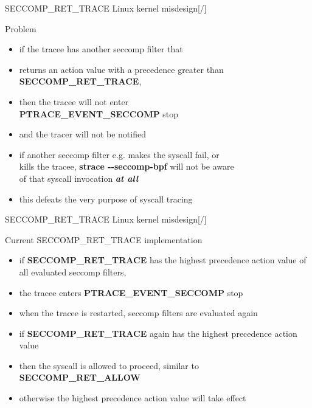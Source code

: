 \documentclass[unicode,aspectratio=169,xcolor={table,dvipsnames,usenames}]{beamer}
\begin{document}
\begin{frame}{\Large SECCOMP\_RET\_TRACE Linux kernel misdesign\hfill [\insertframenumber/\inserttotalframenumber]}
\Large
\begin{block}{Problem}
\begin{itemize}
	\item if the tracee has another seccomp filter that
	\item returns an action value with a precedence greater than \textbf{SECCOMP\_RET\_TRACE},
	\item then the tracee will not enter \\
		\textbf{PTRACE\_EVENT\_SECCOMP} stop
	\item and the tracer will not be notified
	\item if another seccomp filter e.g. makes the syscall fail, or \\
		kills the tracee, \textbf{strace -{}-seccomp-bpf} will not be aware \\
		of that syscall invocation \textbf{\textit{at all}}
	\item this defeats the very purpose of syscall tracing
\end{itemize}
\end{block}
\end{frame}

\begin{frame}{\Large SECCOMP\_RET\_TRACE Linux kernel misdesign\hfill [\insertframenumber/\inserttotalframenumber]}
\Large
\begin{block}{Current SECCOMP\_RET\_TRACE implementation}
\begin{itemize}
	\item if \textbf{SECCOMP\_RET\_TRACE} has the highest precedence action value of all evaluated seccomp filters,
	\item the tracee enters \textbf{PTRACE\_EVENT\_SECCOMP} stop
	\item when the tracee is restarted, seccomp filters are evaluated again
	\item if \textbf{SECCOMP\_RET\_TRACE} again has the highest precedence action value
	\item then the syscall is allowed to proceed, similar to \textbf{SECCOMP\_RET\_ALLOW}
	\item otherwise the highest precedence action value will take effect
\end{itemize}
\end{block}
\end{frame}
\end{document}
